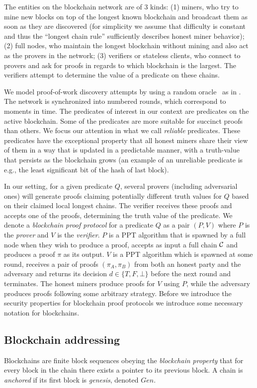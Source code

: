The entities on the blockchain network are of 3 kinds: (1) miners, who
try to mine new blocks on top of the longest known blockchain and broadcast them
as soon as they are discovered (for simplicity we assume that difficulty
is constant and thus the ``longest chain rule'' sufficiently describes honest miner behavior); (2) full nodes, who maintain the longest
blockchain without mining and also act as the provers in the network; (3)
verifiers or stateless clients, who connect to provers and ask for proofs in
regards to which blockchain is the largest. The verifiers attempt to determine
the value of a predicate on these chains.

We model proof-of-work discovery attempts by using a random oracle~\cite{RO} as
in \cite{backbone}. The network is synchronized into numbered rounds, which
correspond to moments in time. The predicates of interest in our context are
predicates on the active blockchain. Some of the predicates are more suitable
for succinct proofs than others. We focus our attention in what we call
\textit{reliable} predicates. These predicates have the exceptional property
that all honest miners share their view of them in a way that is updated in a
predictable manner, with a truth-value that persists as the blockchain grows (an
example of an unreliable predicate is e.g., the least significant bit of the
hash of last block).

In our setting, for a given predicate $Q$,
several  provers (including adversarial ones)
will generate proofs claiming potentially different truth values for
$Q$ based on their claimed local longest chains. The verifier
receives these proofs and accepts one of the proofs, determining the truth value
of the predicate.  We denote a  \textit{blockchain proof protocol} for a predicate $Q$ as a pair $(P, V)$ where $P$ is the \textit{prover} and $V$ is the \textit{verifier}. $P$ is a PPT algorithm that is spawned by a full node when they wish to produce a proof,
accepts as input a full chain $\mathcal{C}$ and produces a proof $\pi$ as its output.
$V$ is a PPT algorithm which is spawned at some round,
receives a pair of proofs $(\pi_A, \pi_B)$ from both an honest party and the
adversary and returns its decision $d \in \{T, F, \bot\}$ before the next round
and terminates. The honest miners produce proofs for $V$ using $P$, while the adversary produces proofs following some arbitrary strategy. Before we introduce the security properties for blockchain proof protocols we introduce some necessary notation for blockchains.

\subsection{Blockchain addressing}
Blockchains are finite block sequences obeying the \textit{blockchain property}
that for every block in the chain there exists a pointer to its previous block.
A chain is \textit{anchored} if its first block is \textit{genesis}, denoted
$Gen$.

